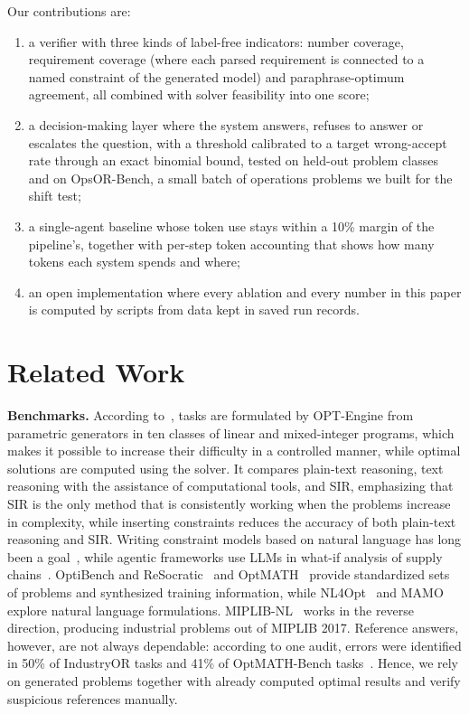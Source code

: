 \documentclass[conference]{IEEEtran}
\begin{document}
\noindent Our contributions are:
\begin{enumerate}
\item a verifier with three kinds of label-free indicators: number coverage, requirement coverage (where each parsed
requirement is connected to a named constraint of the generated model) and paraphrase-optimum agreement, all
combined with solver feasibility into one score;
\item a decision-making layer where the system answers, refuses to answer or escalates the question, with a threshold
calibrated to a target wrong-accept rate through an exact binomial bound, tested on held-out problem classes and on
OpsOR-Bench, a small batch of operations problems we built for the shift test;
\item a single-agent baseline whose token use stays within a 10\% margin of the pipeline's, together with per-step
token accounting that shows how many tokens each system spends and where;
\item an open implementation where every ablation and every number in this paper is computed by scripts from data
kept in saved run records.
\end{enumerate}

\section{Related Work}
\label{sec:related}

\textbf{Benchmarks.} According to~\cite{chen2026optengine}, tasks are formulated by OPT-Engine from parametric
generators in ten classes of linear and mixed-integer programs, which makes it possible to increase their difficulty in
a controlled manner, while optimal solutions are computed using the solver. It compares plain-text reasoning, text
reasoning with the assistance of computational tools, and SIR, emphasizing that SIR is the only method that is
consistently working when the problems increase in complexity, while inserting constraints reduces the accuracy of
both plain-text reasoning and SIR. Writing constraint models based on natural language has long been a
goal~\cite{tsouros2023holy}, while agentic frameworks use LLMs in what-if analysis of supply
chains~\cite{li2023optiguide}. OptiBench and ReSocratic~\cite{yang2025optibench} and OptMATH~\cite{lu2025optmath}
provide standardized sets of problems and synthesized training information, while NL4Opt~\cite{ramamonjison2022nl4opt}
and MAMO~\cite{shen2024mamo} explore natural language formulations. MIPLIB-NL~\cite{li2026miplibnl} works in the
reverse direction, producing industrial problems out of MIPLIB 2017. Reference answers, however, are not always
dependable: according to one audit, errors were identified in 50\% of IndustryOR tasks and 41\% of OptMATH-Bench
tasks~\cite{zhang2025optimind}. Hence, we rely on generated problems together with already computed optimal results and
verify suspicious references manually.
\end{document}
